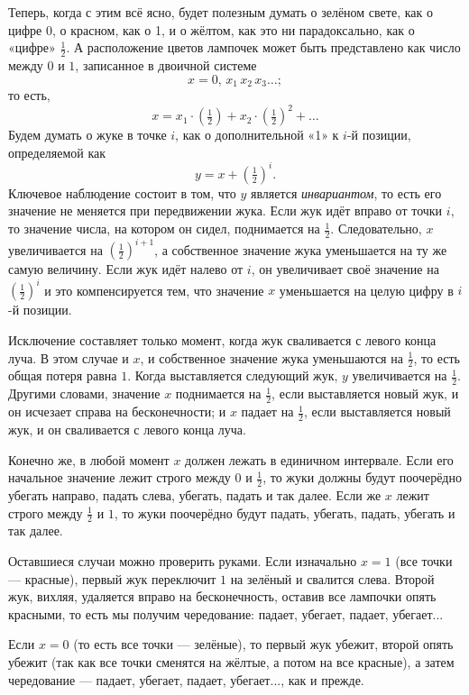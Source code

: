 Теперь, когда с этим всё ясно, будет полезным думать о зелёном свете, как о цифре 0, о красном, как о 1, и о жёлтом, как это ни парадоксально, как о «цифре» $\tfrac12$.
А расположение цветов лампочек может быть представлено как число между $0$ и $1$, записанное в двоичной системе
\[x = 0{,}\,x_1\,x_2\,x_3\dots;\]
то есть,
 \[x = x_1\cdot(\tfrac12)+x_2\cdot(\tfrac12)^2+\dots\]
Будем думать о жуке в точке $i$, как о дополнительной «1» к $i$-й позиции, определяемой как
\[y=x+(\tfrac12)^i.\]
Ключевое наблюдение состоит в том, что $y$ является \emph{инвариантом}, то есть его значение не меняется при передвижении жука.
Если жук идёт вправо от точки $i$, то значение числа, на котором он сидел, поднимается на $\tfrac12$.
Следовательно, $x$ увеличивается на $(\tfrac12)^{i+1}$, а собственное значение жука уменьшается на ту же самую величину.
Если жук идёт налево от $i$, он увеличивает своё значение на $(\tfrac12)^i$ и это компенсируется тем, что значение $x$ уменьшается на целую цифру в $i$-й позиции.

Исключение составляет только момент, когда жук сваливается с левого конца луча.
В этом случае и $x$, и собственное значение жука уменьшаются на $\tfrac12$, то есть общая потеря равна $1$.
Когда выставляется следующий жук, $y$ увеличивается на $\tfrac12$.
Другими словами, значение $x$ поднимается на $\tfrac12$, если выставляется новый жук, и он исчезает справа на бесконечности; и $x$ падает на $\tfrac12$, если выставляется новый жук, и он сваливается с левого конца луча.

Конечно же, в любой момент $x$ должен лежать в единичном интервале.
Если его начальное значение лежит строго между $0$ и $\tfrac12$, то жуки должны будут поочерёдно убегать направо, падать слева, убегать, падать и так далее.
Если же $x$ лежит строго между $\tfrac12$ и $1$, то жуки поочерёдно будут падать, убегать, падать, убегать и так далее.

Оставшиеся случаи можно проверить руками.
Если изначально $x = 1$ (все точки --- красные), первый жук переключит $1$ на зелёный и свалится слева.
Второй жук, вихляя, удаляется вправо на бесконечность, оставив все лампочки опять красными, то есть мы получим чередование: падает, убегает, падает, убегает...

Если $x = 0$ (то есть все точки --- зелёные), то первый жук убежит, второй опять убежит (так как все точки сменятся на жёлтые, а потом на все красные), а затем чередование --- падает, убегает, падает, убегает..., как и прежде.


